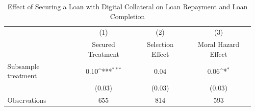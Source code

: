 \begin{table}[htbp]\centering
\def\sym#1{\ifmmode^{#1}\else\(^{#1}\)\fi}
\caption{Effect of Securing a Loan with Digital Collateral on Loan Repayment and Loan Completion\label{LASMH\_repay\_ITT\_200}}
\begin{tabular}{l*{3}{c}}
\toprule
                    &\multicolumn{1}{c}{(1)}&\multicolumn{1}{c}{(2)}&\multicolumn{1}{c}{(3)}\\
                    &\multicolumn{1}{c}{Secured Treatment}&\multicolumn{1}{c}{Selection Effect}&\multicolumn{1}{c}{Moral Hazard Effect}\\
\midrule
Subsample treatment &        0.10\sym{***}&        0.04         &        0.06\sym{*}  \\
                    &      (0.03)         &      (0.03)         &      (0.03)         \\
\midrule
Observations        &         655         &         814         &         593         \\
\bottomrule
\end{tabular}
\end{table}
